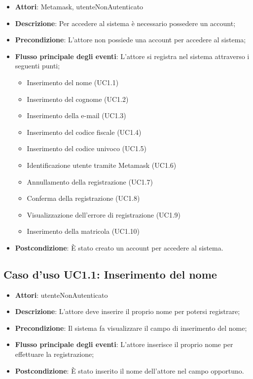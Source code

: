 \begin{itemize}
\item \textbf{Attori}: Metamask, utenteNonAutenticato
\item \textbf{Descrizione}: Per accedere al sistema è necessario possedere un account;
\item \textbf{Precondizione}: L'attore non possiede una account per accedere al sistema;
\item \textbf{Flusso principale degli eventi}: L'attore si registra nel sistema attraverso i seguenti punti;
\begin{itemize}
\item Inserimento del nome (UC1.1)
\item Inserimento del cognome (UC1.2)
\item Inserimento della e-mail (UC1.3)
\item Inserimento del codice fiscale (UC1.4)
\item Inserimento del codice univoco (UC1.5)
\item Identificazione utente tramite Metamask (UC1.6)
\item Annullamento della registrazione (UC1.7)
\item Conferma della registrazione (UC1.8)
\item Visualizzazione dell'errore di registrazione (UC1.9)
\item Inserimento della matricola (UC1.10)
\end{itemize}
\item \textbf{Postcondizione}: È stato creato un account per accedere al sistema.
\end{itemize}
\subsection{Caso d'uso \texorpdfstring{UC1.1}{UC1.1}: Inserimento del nome}
\begin{itemize}
\item \textbf{Attori}: utenteNonAutenticato
\item \textbf{Descrizione}: L'attore deve inserire il proprio nome per potersi registrare;
\item \textbf{Precondizione}: Il sistema fa visualizzare il campo di inserimento del nome;
\item \textbf{Flusso principale degli eventi}: L'attore inserisce il proprio nome per effettuare la registrazione;
\item \textbf{Postcondizione}: È stato inserito il nome dell'attore nel campo opportuno.
\end{itemize}
